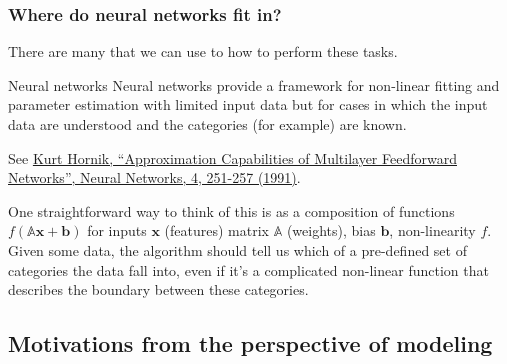 \documentclass[hyperref={colorlinks=true}]{beamer}
\begin{document}
\begin{frame}%
  \frametitle{Where do neural networks fit in?}

  There are many  that we can use to  how to perform these tasks. 
  
  \mysp

  \begin{ucblock}{Neural networks}
  Neural networks provide a framework for non-linear fitting and parameter estimation with limited input data but for cases in which the input data are understood and the categories (for example) are known.  
  \end{ucblock}
  
  \mysp
    
  \begin{center}  \end{center}
  
  See \href{https://doi.org/10.1016/0893-6080(91)90009-T}{Kurt Hornik, ``Approximation Capabilities of Multilayer Feedforward Networks'', Neural Networks, 4, 251-257 (1991)}.
  
  \mysp
  
  One straightforward way to think of this is as a composition of functions $f(\mathbb{A}\mathbf{x}+\mathbf{b})$ for inputs $\mathbf{x}$ (features) matrix $\mathbb{A}$ (weights), bias $\mathbf{b}$, non-linearity $f$. Given some data, the algorithm should tell us which of a pre-defined set of categories the data fall into, even if it's a complicated non-linear function that describes the boundary between these categories.

  
\end{frame}
  
\subsection[Motivations from the perspective of modeling]{Motivations from the perspective of modeling}
\end{document}
